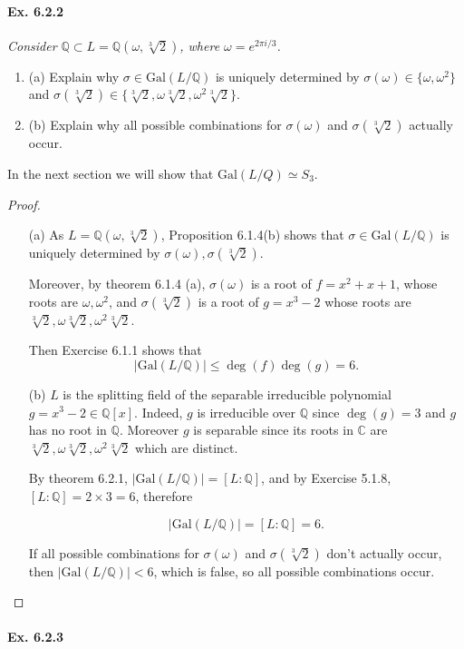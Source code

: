\documentclass[11pt,a4paper]{article}
\newcommand{\be} {\begin{enumerate}}
\newcommand{\ee} {\end{enumerate}}
\newcommand{\Q}{\mathbb{Q}}
\newcommand{\C}{\mathbb{C}}
\newcommand{\Gal}{\mathrm{Gal}}
\begin{document}
\paragraph{Ex. 6.2.2}

{\it Consider $\Q \subset L = \Q(\omega, \sqrt[3]{2})$, where $\omega = e^{2 \pi i/3}$.
\be
\item[(a)] Explain why $\sigma \in \Gal(L/\Q)$ is uniquely determined by $\sigma(\omega) \in \{\omega, \omega^2 \}$ and $\sigma(\sqrt[3]{2}) \in \{\sqrt[3]{2},\omega \sqrt[3]{2}, \omega^2 \sqrt[3]{2} \}$.
\item[(b)] Explain why all possible combinations for $\sigma(\omega)$ and $\sigma(\sqrt[3]{2})$ actually occur.
\ee
In the next section we will show that $\Gal(L/Q) \simeq S_3$.
}

\begin{proof}
\begin{enumerate}
\item[(a)]
As $L = \Q(\omega,\sqrt[3]{2})$, Proposition 6.1.4(b) shows that $\sigma \in \mathrm{Gal}(L/\Q)$ is uniquely determined by $\sigma(\omega),\sigma(\sqrt[3]{2})$.

Moreover, by theorem 6.1.4 (a), $\sigma(\omega)$ is a root of $f = x^2+x+1$, whose roots are $\omega,\omega^2$, and $\sigma(\sqrt[3]{2})$ is a root of $g = x^3-2$ whose roots are $\sqrt[3]{2}, \omega\sqrt[3]{2},\omega^2\sqrt[3]{2}$.

Then Exercise 6.1.1 shows that $$\vert \mathrm{Gal}(L/\Q)\vert \leq \deg(f)\deg(g)=6.$$

\item[(b)]
$L$ is the splitting field of the separable irreducible polynomial $g = x^3-2\in \Q[x]$. Indeed, $g$ is irreducible over $\Q$ since $\deg(g) = 3$ and $g$ has no root in $\Q$. Moreover $g$ is separable since its roots in $\C$ are $\sqrt[3]{2}, \omega\sqrt[3]{2},\omega^2\sqrt[3]{2}$ which are distinct.

By theorem 6.2.1, $\vert \mathrm{Gal}(L/\Q)\vert = [L:\Q]$, and by Exercise 5.1.8, $[L:\Q] = 2 \times 3 = 6$, therefore

$$\vert \mathrm{Gal}(L/\Q)\vert = [L:\Q]=6.$$

If all possible combinations for $\sigma(\omega)$ and $\sigma(\sqrt[3]{2})$ don't actually occur, then $\vert \mathrm{Gal}(L/\Q)\vert <6$, which is false, so all possible combinations occur.
\end{enumerate}
\end{proof}

\paragraph{Ex. 6.2.3}
\end{document}
